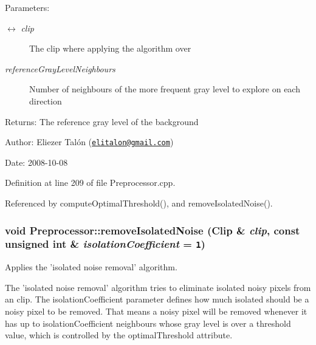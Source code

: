 \begin{Desc}
\item[Parameters:]
\begin{description}
\item[\mbox{$\leftrightarrow$} {\em clip}]The clip where applying the algorithm over \item[{\em referenceGrayLevelNeighbours}]Number of neighbours of the more frequent gray level to explore on each direction\end{description}
\end{Desc}
\begin{Desc}
\item[Returns:]The reference gray level of the background\end{Desc}
\begin{Desc}
\item[Author:]Eliezer Talón (\href{mailto:elitalon@gmail.com}{\tt elitalon@gmail.com}) \end{Desc}
\begin{Desc}
\item[Date:]2008-10-08 \end{Desc}


Definition at line 209 of file Preprocessor.cpp.

Referenced by computeOptimalThreshold(), and removeIsolatedNoise().\hypertarget{class_preprocessor_a365f69af48cae608071e9943f300dd5}{
\subsubsection[removeIsolatedNoise]{\setlength{\rightskip}{0pt plus 5cm}void Preprocessor::removeIsolatedNoise ({\bf Clip} \& {\em clip}, \/  const unsigned int \& {\em isolationCoefficient} = {\tt 1})}}
\label{class_preprocessor_a365f69af48cae608071e9943f300dd5}


Applies the 'isolated noise removal' algorithm. 

The 'isolated noise removal' algorithm tries to eliminate isolated noisy pixels from an clip. The isolationCoefficient parameter defines how much isolated should be a noisy pixel to be removed. That means a noisy pixel will be removed whenever it has up to isolationCoefficient neighbours whose gray level is over a threshold value, which is controlled by the optimalThreshold attribute.

